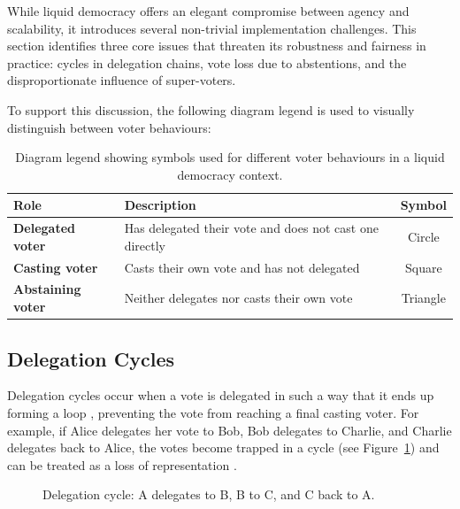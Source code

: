 While liquid democracy offers an elegant compromise between agency and scalability, it introduces several non-trivial implementation challenges. This section identifies three core issues that threaten its robustness and fairness in practice: cycles in delegation chains, vote loss due to abstentions, and the disproportionate influence of super-voters.

To support this discussion, the following diagram legend is used to visually distinguish between voter behaviours:

\begin{table}[H]
  \centering
  \begin{tabular}{|l|l|c|}
  \hline
  \textbf{Role} & \textbf{Description} & \textbf{Symbol}\\ \hline
  \textbf{Delegated voter} & Has delegated their vote and does not cast one directly & Circle \\
  \textbf{Casting voter} & Casts their own vote and has not delegated & Square \\
  \textbf{Abstaining voter} & Neither delegates nor casts their own vote & Triangle \\
  \hline
  \end{tabular}
  \caption{Diagram legend showing symbols used for different voter behaviours in a liquid democracy context.}
\end{table}  

\subsection*{Delegation Cycles}\label{subsec:delegation_cycles}
Delegation cycles occur when a vote is delegated in such a way that it ends up forming a loop \citep{brill_liquid_2022}, preventing the vote from reaching a final casting voter. For example, if Alice delegates her vote to Bob, Bob delegates to Charlie, and Charlie delegates back to Alice, the votes become trapped in a cycle (see Figure~\ref{fig:triangle-cycle}) and can be treated as a loss of representation \citep{christoff2017liquiddemocracyanalysisbinary}.

\begin{figure}[H]
  \centering
  \caption{Delegation cycle: A delegates to B, B to C, and C back to A.}
  \label{fig:triangle-cycle}
\end{figure}

